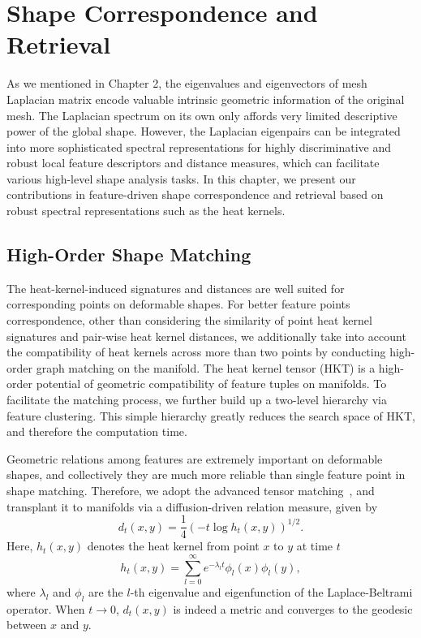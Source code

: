 \chapter{Shape Correspondence and Retrieval}

As we mentioned in Chapter 2, the eigenvalues and eigenvectors of mesh Laplacian matrix 
encode valuable intrinsic geometric information of the original mesh. The Laplacian
spectrum on its own only affords very limited descriptive power of the global shape. 
However, the Laplacian eigenpairs can be integrated into more sophisticated spectral 
representations for highly discriminative and robust local feature descriptors and 
distance measures, which can facilitate various high-level shape analysis tasks. 
In this chapter, we present our contributions in feature-driven shape correspondence and 
retrieval based on robust spectral representations such as the heat kernels. 

\section{High-Order Shape Matching}

The heat-kernel-induced signatures and distances are well suited for corresponding points on deformable shapes.
For better feature points correspondence, other than considering the similarity of point heat kernel signatures
and pair-wise heat kernel distances, we additionally take into account the compatibility of heat kernels across
more than two points by conducting high-order graph matching on the manifold. The heat kernel tensor (HKT) is a
high-order potential of geometric compatibility of feature tuples on manifolds. To facilitate the matching process,
we further build up a two-level hierarchy via feature clustering. This simple hierarchy greatly reduces the search
space of HKT, and therefore the computation time.

Geometric relations among features are extremely important on deformable shapes, and collectively they are much
more reliable than single feature point in shape matching. Therefore, we adopt the advanced tensor
matching~\cite{Duchenne:CVPR:2011}, and transplant it to manifolds via a diffusion-driven relation measure, given by
\begin{equation}
d_{t}(x,y)=\frac{1}{4}(-t\log h_{t}(x,y))^{1/2}.
\end{equation}
Here, $h_t(x,y)$ denotes the heat kernel from point $x$ to $y$ at time $t$
\begin{equation}
h_t(x,y)=\sum_{l=0}^{\infty}e^{-\lambda_l t}\phi_l(x)\phi_l(y),
\end{equation}
where $\lambda_l$ and $\phi_l$ are the $l$-th eigenvalue and eigenfunction of the Laplace-Beltrami operator. When $t\to 0$, $d_{t}(x,y)$ is indeed a metric and converges to the geodesic between $x$ and $y$.

